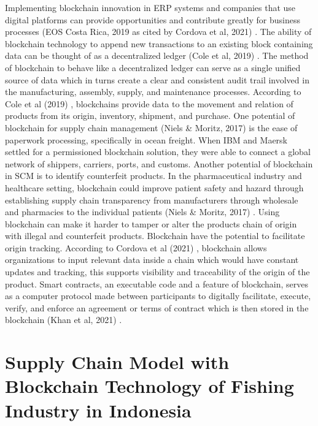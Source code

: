 Implementing blockchain innovation in ERP systems and companies that use digital platforms can  provide opportunities and contribute greatly for business processes (EOS Costa Rica, 2019 as cited by Cordova et al, 2021) \nocite{rrl-OBTSCM1}.  The ability of blockchain technology to append new transactions to an existing block containing data can be thought of as a decentralized ledger (Cole et al, 2019) \nocite{rrl-OBTSCM5}. The method of blockchain to behave like a decentralized ledger can serve as a single unified source of data which in turns create a clear and consistent audit trail involved in the manufacturing, assembly, supply, and maintenance processes. According to Cole et al (2019) \nocite{rrl-OBTSCM5}, blockchains provide data to the movement and relation of products from its origin, inventory, shipment, and purchase. One potential of blockchain for supply chain management (Niels \& Moritz, 2017) \nocite{rrl-OBTSCM6} is the ease of paperwork processing, specifically in ocean freight. When IBM and Maersk settled for a permissioned blockchain solution, they were able to connect a global network of shippers, carriers, ports, and customs. Another potential of blockchain in SCM is to identify counterfeit products. In the pharmaceutical industry and healthcare setting, blockchain could improve patient safety and hazard through establishing supply chain transparency from manufacturers through wholesale and pharmacies to the individual patients (Niels \& Moritz, 2017) \nocite{rrl-OBTSCM6}. Using blockchain can make it harder to tamper or alter the products chain of origin with illegal and counterfeit products. Blockchain have the potential to facilitate origin tracking. According to Cordova et al (2021) \nocite{rrl-OBTSCM1}, blockchain allows organizations to input relevant data inside a chain which would have constant updates and tracking, this supports visibility and traceability of the origin of the product. Smart contracts, an executable code and a feature of blockchain, serves as a computer protocol made between participants to digitally facilitate, execute, verify, and enforce an agreement or terms of contract which is then stored in the blockchain (Khan et al, 2021) \nocite{rrl-OBTSCM7}.

\section{Supply Chain Model with Blockchain Technology of Fishing Industry in Indonesia}

